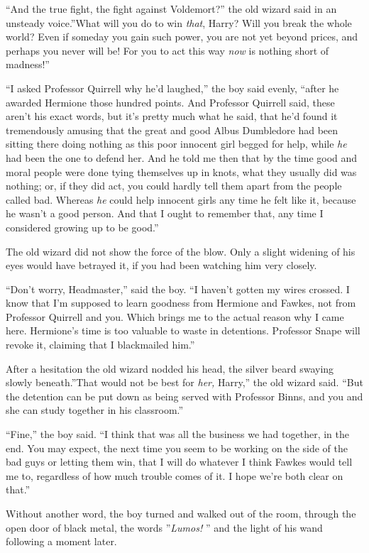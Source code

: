 ``And the true fight, the fight against Voldemort?'' the old wizard said
in an unsteady voice.''What will you do to win \emph{that}, Harry? Will
you break the whole world? Even if someday you gain such power, you are
not yet beyond prices, and perhaps you never will be! For you to act
this way \emph{now} is nothing short of madness!''

``I asked Professor Quirrell why he'd laughed,'' the boy said evenly,
``after he awarded Hermione those hundred points. And Professor Quirrell
said, these aren't his exact words, but it's pretty much what he said,
that he'd found it tremendously amusing that the great and good Albus
Dumbledore had been sitting there doing nothing as this poor innocent
girl begged for help, while \emph{he} had been the one to defend her.
And he told me then that by the time good and moral people were done
tying themselves up in knots, what they usually did was nothing; or, if
they did act, you could hardly tell them apart from the people called
bad. Whereas \emph{he} could help innocent girls any time he felt like
it, because he wasn't a good person. And that I ought to remember that,
any time I considered growing up to be good.''

The old wizard did not show the force of the blow. Only a slight
widening of his eyes would have betrayed it, if you had been watching
him very closely.

``Don't worry, Headmaster,'' said the boy. ``I haven't gotten my wires
crossed. I know that I'm supposed to learn goodness from Hermione and
Fawkes, not from Professor Quirrell and you. Which brings me to the
actual reason why I came here. Hermione's time is too valuable to waste
in detentions. Professor Snape will revoke it, claiming that I
blackmailed him.''

After a hesitation the old wizard nodded his head, the silver beard
swaying slowly beneath.''That would not be best for \emph{her,} Harry,''
the old wizard said. ``But the detention can be put down as being served
with Professor Binns, and you and she can study together in his
classroom.''

``Fine,'' the boy said. ``I think that was all the business we had
together, in the end. You may expect, the next time you seem to be
working on the side of the bad guys or letting them win, that I will do
whatever I think Fawkes would tell me to, regardless of how much trouble
comes of it. I hope we're both clear on that.''

Without another word, the boy turned and walked out of the room, through
the open door of black metal, the words ''\emph{Lumos!} '' and the light
of his wand following a moment later.


